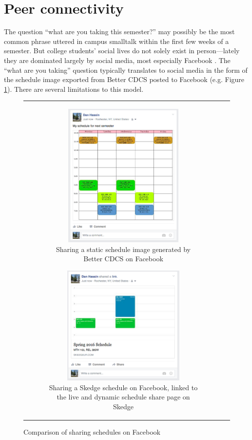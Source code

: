 
\section{Peer connectivity}

The question ``what are you taking this semester?'' may possibly be the most common phrase uttered in campus smalltalk within the first few weeks of a semester. But college students' social lives do not solely exist in person---lately they are dominated largely by social media, most especially Facebook \cite{fb}. The ``what are you taking'' question typically translates to social media in the form of the schedule image exported from Better CDCS posted to Facebook (e.g. Figure \ref{fig:cdcs-social}). There are several limitations to this model.

\begin{figure}[H]
  \centering
  \vspace{5pt}
  \begin{tabular}{c c}

    \begin{subfigure}[w]{7cm}
      \centering
      \includegraphics[width=6cm]{images/cdcs/social}
      \caption{Sharing a static schedule image generated by Better CDCS on Facebook} \label{fig:cdcs-social}
    \end{subfigure}

    \hspace{10pt}

    \begin{subfigure}[w]{7cm}
      \centering
      \includegraphics[width=6.1cm]{images/skedge/facebook}
      \caption{Sharing a Skedge schedule on Facebook, linked to the live and dynamic schedule share page on Skedge} \label{fig:sk-fb}
    \end{subfigure}

  \end{tabular}
  \caption{Comparison of sharing schedules on Facebook}
\end{figure}

